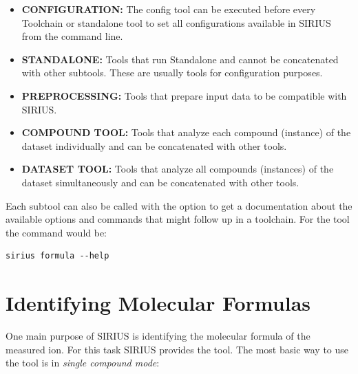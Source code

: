 \documentclass[letterpaper,10pt,openany,oneside]{sphinxmanual}
\begin{document}
\begin{itemize}
	\item \textbf{CONFIGURATION: }
	The config tool can be executed before every Toolchain or standalone tool to set all configurations available in SIRIUS from the command line.
	\item \textbf{STANDALONE: }
	Tools that run Standalone and cannot be concatenated with other subtools. These are usually tools for configuration purposes.
	\item \textbf{PREPROCESSING: }
	Tools that prepare input data to be compatible with SIRIUS. 
	\item \textbf{COMPOUND TOOL: }
	Tools that analyze each compound (instance) of the dataset individually and can be concatenated with other tools.
	\item \textbf{DATASET TOOL: }
	Tools that analyze all compounds (instances) of the dataset simultaneously and can be concatenated with other tools.
\end{itemize}

Each subtool can also be called with the  option to get a documentation about the available options and commands that might follow up in a toolchain. For the  tool the command would be: 

\begin{Verbatim}[commandchars=\\\{\}]
sirius formula --help
\end{Verbatim}






\section{Identifying Molecular Formulas}
\label{commandline:identifying-molecular-formulas}
One main purpose of SIRIUS is identifying the molecular formula of the measured ion. For this task SIRIUS provides the  tool. The most basic way to use the  tool is in \emph{single compound mode}:
\end{document}

